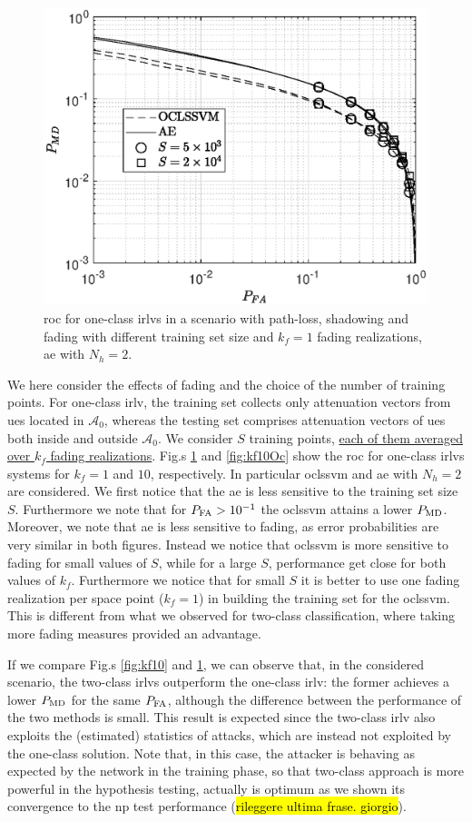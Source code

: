 \documentclass[draftcls,onecolumn,12pt]{IEEEtran}
\begin{document}
\begin{figure}[t]
    \centering
    \includegraphics[width=0.6\columnwidth]{res_Training_10BS_oneClass.eps}
    \caption{\ac{roc} for one-class \acp{irlv} in a scenario with path-loss, shadowing and fading with different training set size and $k_f=1$ fading realizations,  \ac{ae} with $N_h = 2$. }
    \label{fig:kf1Oc}
\end{figure}


We here consider the effects of fading and the choice of the number of training points. For one-class \ac{irlv}, the training set collects only attenuation vectors from \acp{ue} located in $\mathcal{A}_0$, whereas the testing set comprises attenuation vectors of \acp{ue} both inside and outside $\mathcal A_0$. We consider $S$ training points, \underline{each of them averaged over $k_f$ fading realizations}. Fig.s \ref{fig:kf1Oc} and \ref{fig:kf10Oc} show the \ac{roc} for one-class \acp{irlv} systems for $k_f = 1$ and $10$, respectively. In particular \ac{oclssvm} and  \ac{ae} with $N_h=2$ are considered.  We first notice that the \ac{ae} is less sensitive to the training set size $S$. Furthermore we note that for $P_{\rm FA} > 10^{-1}$ the \ac{oclssvm} attains a lower  $P_{\rm MD}$. Moreover, we note that \ac{ae} is less sensitive to fading, as error probabilities are very similar in both figures. Instead we notice that  \ac{oclssvm} is more sensitive to fading for small values of $S$, while for a large $S$, performance get close for both values of $k_f$. Furthermore we notice that for small $S$ it is better to use one fading realization per space point ($k_f=1$) in building the training set for the \ac{oclssvm}. This is different  from what we observed for two-class classification, where taking more fading measures provided an advantage.  

If we compare Fig.s \ref{fig:kf10} and \ref{fig:kf1Oc}, we can observe that, in the considered scenario, the two-class \acp{irlv} outperform the one-class \ac{irlv}: the former achieves a lower $P_{\rm MD}$ for the same $P_{\rm FA}$, although the difference between the performance of the two methods is small. This result is expected since the two-class \ac{irlv} also exploits the (estimated) statistics of attacks, which are instead not exploited by the one-class solution. Note that, in this case, the attacker is behaving as expected by the network in the training phase, so that two-class approach is more powerful in the hypothesis testing, actually is optimum  as we shown its convergence to the \ac{np} test performance (\hl{rileggere ultima frase. giorgio}).
 
\end{document}
